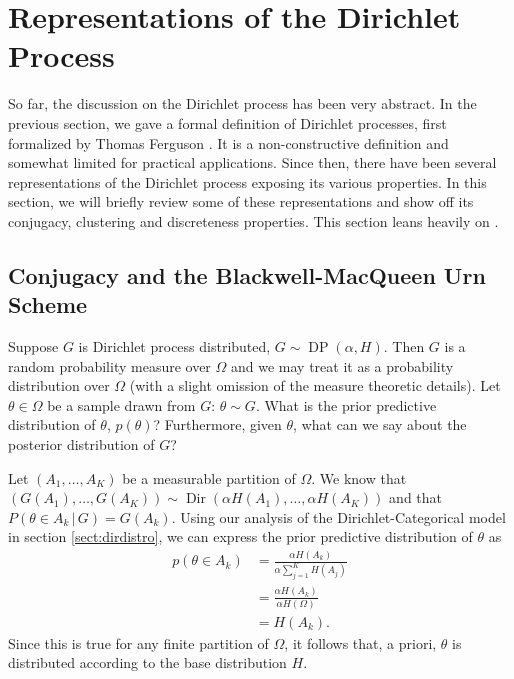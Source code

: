 \documentclass[final,3p,times,twocolumn]{elsarticle}
\DeclareMathOperator*{\Dir}{Dir}
\DeclareMathOperator*{\DP}{DP}
\begin{document}
\section{Representations of the Dirichlet Process}
\label{sect:representations}
So far, the discussion on the Dirichlet process has been very abstract.
In the previous section, we gave a formal definition of Dirichlet processes, first formalized by Thomas Ferguson \cite{ferguson1973}.
It is a non-constructive definition and somewhat limited for practical applications.
Since then, there have been several representations of the Dirichlet process exposing its various properties.
In this section, we will briefly review some of these representations and show off its conjugacy, clustering and discreteness properties.
This section leans heavily on \cite{Teh2010a}.

\subsection{Conjugacy and the Blackwell-MacQueen Urn Scheme}
Suppose $G$ is Dirichlet process distributed, $G \sim \DP(\alpha,H)$.
Then $G$ is a random probability measure over $\Omega$ and we may treat it as a probability distribution over $\Omega$ (with a slight omission of the measure theoretic details).
Let $\theta \in \Omega$ be a sample drawn from $G$: $\theta \sim G$.
What is the prior predictive distribution of $\theta$, $p(\theta)$? Furthermore, given $\theta$, what can we say about the posterior distribution of $G$?

Let $(A_1,\dots,A_K)$ be a measurable partition of $\Omega$. 
We know that $(G(A_1),\dots,G(A_K))\sim \Dir(\alpha H(A_1),\dots,\alpha H(A_K))$ and that $P(\theta \in A_k \,|\, G) = G(A_k)$.
Using our analysis of the Dirichlet-Categorical model in section \ref{sect:dirdistro}, we can express the prior predictive distribution of $\theta$ as
\begin{equation}
\label{eqn:dppriorpredictive}
\begin{split}
p(\theta \in A_k) &= \frac{\alpha H(A_k)}{\alpha \sum_{j=1}^K H(A_j)}\\
&= \frac{\alpha H(A_k)}{\alpha H(\Omega)}\\
&= H(A_k).
\end{split}
\end{equation}
Since this is true for any finite partition of $\Omega$, it follows that, a priori, $\theta$ is distributed according to the base distribution $H$.
\end{document}
